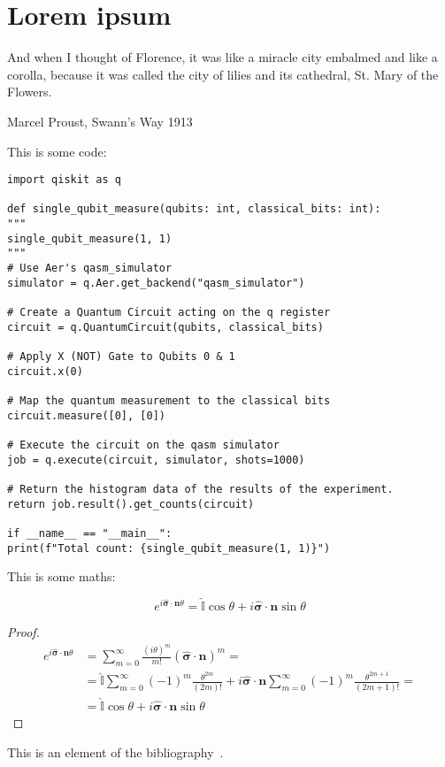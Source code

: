 \section{Lorem ipsum}
\epigraph{And when I thought of Florence, it was like a miracle city embalmed and like a corolla, because it was called the city of lilies and its cathedral, St. Mary of the Flowers.}{Marcel Proust, Swann's Way 1913}



This is some code:
\begin{verbatim}
import qiskit as q

def single_qubit_measure(qubits: int, classical_bits: int):
"""
single_qubit_measure(1, 1)
"""
# Use Aer's qasm_simulator
simulator = q.Aer.get_backend("qasm_simulator")

# Create a Quantum Circuit acting on the q register
circuit = q.QuantumCircuit(qubits, classical_bits)

# Apply X (NOT) Gate to Qubits 0 & 1
circuit.x(0)

# Map the quantum measurement to the classical bits
circuit.measure([0], [0])

# Execute the circuit on the qasm simulator
job = q.execute(circuit, simulator, shots=1000)

# Return the histogram data of the results of the experiment.
return job.result().get_counts(circuit)

if __name__ == "__main__":
print(f"Total count: {single_qubit_measure(1, 1)}")
\end{verbatim}
This is some maths:


\begin{theorem}
\begin{equation*}
e^{i\hat{\boldsymbol{\sigma}} \cdot \mathbf{n}\theta} = \hat{\mathbb{I}}\cos\theta + i\hat{\boldsymbol{\sigma}} \cdot \mathbf{n} \sin\theta
\end{equation*}
\end{theorem}
\begin{proof}
\begin{equation*}
\begin{split}
    e^{i\hat{\boldsymbol{\sigma}} \cdot \mathbf{n}\theta} &=  \sum_{m=0}^\infty \frac{(i\theta)^m}{m!} (\hat{\boldsymbol{\sigma}} \cdot \mathbf{n} )^m = \\
    &= \hat{\mathbb{I}} \sum_{m=0}^\infty (-1)^m \frac{\theta^{2m}}{(2m)!}  + i\hat{\boldsymbol{\sigma}} \cdot \mathbf{n} \sum_{m=0}^\infty (-1)^m \frac{\theta^{2m+1}}{(2m+1)!} = \\
    &= \hat{\mathbb{I}}\cos\theta + i\hat{\boldsymbol{\sigma}} \cdot \mathbf{n} \sin\theta
\end{split}
\end{equation*}
\end{proof}

This is an element of the bibliography~\cite{2022}.
